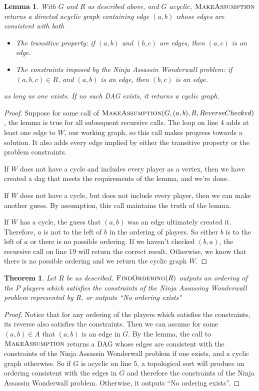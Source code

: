 \documentclass{article}
\newtheorem*{lem}{Lemma}
\newtheorem*{thm}{Theorem}
\begin{document}
\begin{lem}
With $G$ and $R$ as described above, and $G$ acyclic, $\textnormal{\scshape MakeAssumption}$ returns a directed acyclic graph containing edge $(a,b)$ whose edges are consistent with both 
\begin{itemize}
    \item The transitive property: if $(a,b)$ and $(b,c)$ are edges, then $(a,c)$ is an edge.
    \item The constraints imposed by the Ninja Assassin Wonderwall problem: if $(a,b,c) \in R$, and $(a,b)$ is an edge, then $(b,c)$ is an edge.
\end{itemize}
as long as one exists. If no such DAG exists, it returns a cyclic graph.
\end{lem}
\begin{proof}
Suppose for some call of $\textnormal{\scshape MakeAssumption}(G,(a,b),R,ReverseChecked)$, the lemma is true for all subsequent recursive calls.
The  loop on line 4 adds at least one edge to $W$, our working graph, so this call makes progress towards a solution. It also adds every edge implied by either the transitive property or the problem constraints.

If $W$ does not have a cycle and includes every player as a vertex, then we have created a dag that meets the requirements of the lemma, and we're done.

If $W$ does not have a cycle, but does not include every player, then we can make another guess. By assumption, this call maintains the truth of the lemma.

If $W$ has a cycle, the guess that $(a,b)$ was an edge ultimately created it. Therefore, $a$ is not to the left of $b$ in the ordering of players. So either $b$ is to the left of $a$ or there is no possible ordering. If we haven't checked $(b,a)$, the recursive call on line 19 will return the correct result. Otherwise, we know that there is no possible ordering and we return the cyclic graph $W$.
\end{proof}

\begin{thm}
Let $R$ be as described. $\textnormal{\scshape FindOrdering}(R)$ outputs an ordering of the $P$ players which satisfies the constraints of the Ninja Assassing Wonderwall problem represented by $R$, or outputs ``No ordering exists"
\end{thm}
\begin{proof}
Notice that for any ordering of the players which satisfies the constraints, its reverse also satisfies the constraints. Then we can assume for some $(a,b) \in A$ that $(a,b)$ is an edge in $G$. By the lemma, the call to $\textnormal{\scshape MakeAssumption}$ returns a DAG whose edges are consistent with the constraints of the Ninja Assassin Wonderwall problem if one exists, and a cyclic graph otherwise. So if $G$ is acyclic on line 5, a topological sort will produce an ordering consistent with the edges in $G$ and therefore the constraints of the Ninja Assassin Wonderwall problem. Otherwise, it outputs ``No ordering exists''.
\end{proof}
\end{document}
